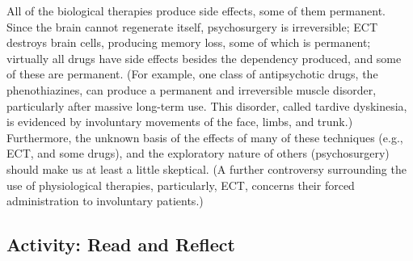 \documentclass[
]{book}
\begin{document}
All of the biological therapies produce side effects, some of them permanent. Since the brain cannot regenerate itself, psychosurgery is irreversible; ECT destroys brain cells, producing memory loss, some of which is permanent; virtually all drugs have side effects besides the dependency produced, and some of these are permanent. (For example, one class of antipsychotic drugs, the phenothiazines, can produce a permanent and irreversible muscle disorder, particularly after massive long-term use. This disorder, called tardive dyskinesia, is evidenced by involuntary movements of the face, limbs, and trunk.) Furthermore, the unknown basis of the effects of many of these techniques (e.g., ECT, and some drugs), and the exploratory nature of others (psychosurgery) should make us at least a little skeptical. (A further controversy surrounding the use of physiological therapies, particularly, ECT, concerns their forced administration to involuntary patients.)

\hypertarget{activity-read-and-reflect-26}{%
\subsection*{Activity: Read and Reflect}\label{activity-read-and-reflect-26}}
\end{document}
